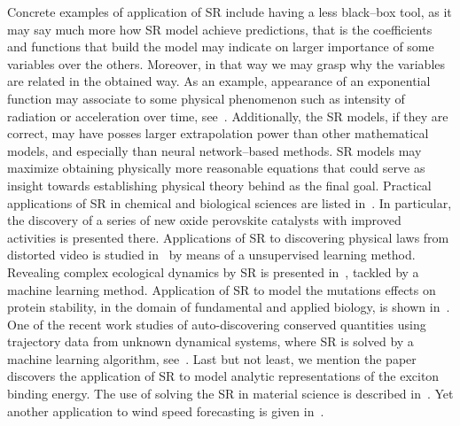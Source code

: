 \documentclass[a4paper,12pt]{elsarticle}
\begin{document}
	 Concrete examples of application of SR include having a less black--box tool, as it may say much more how SR model achieve predictions, that is the coefficients and functions that build the model may indicate on larger importance of some variables over the others. Moreover, in that way we may grasp why the variables are related in the obtained way. As an example, appearance of an exponential function may associate  to  some physical phenomenon such as intensity of radiation or acceleration over time, see~\cite{udrescu2020ai}. Additionally, the SR models, if they are correct, may have    posses  larger extrapolation power than other mathematical models, and especially than neural network--based methods. SR models may maximize obtaining physically more reasonable equations that could serve as insight towards  establishing  physical theory behind as the final goal.  Practical applications of SR in chemical and biological sciences are listed in~\cite{weng2020simple}. In particular,  the discovery of a series of new oxide perovskite catalysts with improved activities is presented there. Applications of SR to discovering physical laws from distorted video is studied in~\cite{udrescu2021symbolic} by means of a unsupervised learning method. Revealing complex ecological dynamics by SR is presented in~\cite{chen2019revealing}, tackled by  a machine learning method. Application of SR to model the mutations effects on protein  stability, in the domain of fundamental and applied biology,  is shown in~\cite{louis2021reviewing}. One of the recent work studies of  auto-discovering conserved quantities using trajectory data from unknown dynamical systems, where SR is solved by a machine learning algorithm, see~\cite{liu2021machine}. Last but not least, we mention the paper~\cite{liang2019phillips} discovers  the application of  SR to model analytic representations of the exciton binding energy. The use of solving the SR in material science is described in~\cite{wang2019symbolic,wang2022symbolic,burlacu2022symbolic,kabliman2021application}. Yet another application to wind speed forecasting is given in~\cite{abdellaoui2021symbolic}. 
	 
	 
	 
\end{document}
